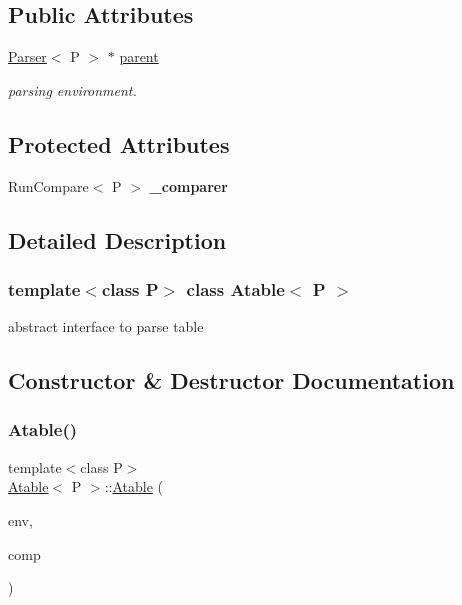 \subsection*{Public Attributes}
\begin{DoxyCompactItemize}
\item 
\mbox{\label{classAtable_a43c761e5718010983659d7162f89d8d3}} 
\mbox{\hyperlink{classParser}{Parser}}$<$ P $>$ $\ast$ \mbox{\hyperlink{classAtable_a43c761e5718010983659d7162f89d8d3}{parent}}
\begin{DoxyCompactList}\small\item\em parsing environment. \end{DoxyCompactList}\end{DoxyCompactItemize}
\subsection*{Protected Attributes}
\begin{DoxyCompactItemize}
\item 
\mbox{\label{classAtable_a84214b2c984a18a8cec13313152d3eaa}} 
Run\+Compare$<$ P $>$ {\bfseries \+\_\+comparer}
\end{DoxyCompactItemize}


\subsection{Detailed Description}
\subsubsection*{template$<$class P$>$\newline
class Atable$<$ P $>$}

abstract interface to parse table 

\subsection{Constructor \& Destructor Documentation}
\mbox{\label{classAtable_ad519343a13265a31ba1d0951be0e3185}} 
\subsubsection{\texorpdfstring{Atable()}{Atable()}}
{\footnotesize\ttfamily template$<$class P$>$ \\
\mbox{\hyperlink{classAtable}{Atable}}$<$ P $>$\+::\mbox{\hyperlink{classAtable}{Atable}} (\begin{DoxyParamCaption}\item[{\mbox{\hyperlink{classParser}{Parser}}$<$ P $>$ $\ast$}]{env,  }\item[{Run\+Compare$<$ P $>$}]{comp }\end{DoxyParamCaption})}


